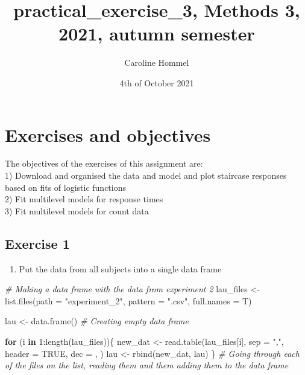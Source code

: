 \documentclass[
]{article}
\title{practical\_exercise\_3, Methods 3, 2021, autumn semester}
\author{Caroline Hommel}
\date{4th of October 2021}
\newenvironment{Shaded}{\begin{snugshade}}{\end{snugshade}}
\newcommand{\AttributeTok}[1]{\textcolor[rgb]{0.77,0.63,0.00}{#1}}
\newcommand{\CommentTok}[1]{\textcolor[rgb]{0.56,0.35,0.01}{\textit{#1}}}
\newcommand{\ConstantTok}[1]{\textcolor[rgb]{0.00,0.00,0.00}{#1}}
\newcommand{\ControlFlowTok}[1]{\textcolor[rgb]{0.13,0.29,0.53}{\textbf{#1}}}
\newcommand{\DecValTok}[1]{\textcolor[rgb]{0.00,0.00,0.81}{#1}}
\newcommand{\FunctionTok}[1]{\textcolor[rgb]{0.00,0.00,0.00}{#1}}
\newcommand{\NormalTok}[1]{#1}
\newcommand{\OtherTok}[1]{\textcolor[rgb]{0.56,0.35,0.01}{#1}}
\newcommand{\SpecialCharTok}[1]{\textcolor[rgb]{0.00,0.00,0.00}{#1}}
\newcommand{\StringTok}[1]{\textcolor[rgb]{0.31,0.60,0.02}{#1}}
\providecommand{\tightlist}{%
  \setlength{\itemsep}{0pt}\setlength{\parskip}{0pt}}
\begin{document}
\maketitle

\hypertarget{exercises-and-objectives}{%
\section{Exercises and objectives}\label{exercises-and-objectives}}

The objectives of the exercises of this assignment are:\\
1) Download and organised the data and model and plot staircase
responses based on fits of logistic functions\\
2) Fit multilevel models for response times\\
3) Fit multilevel models for count data

\hypertarget{exercise-1}{%
\subsection{Exercise 1}\label{exercise-1}}

\begin{enumerate}
\def\labelenumi{\arabic{enumi})}
\tightlist
\item
  Put the data from all subjects into a single data frame
\end{enumerate}

\begin{Shaded}
\begin{Highlighting}[]
\CommentTok{\# Making a data frame with the data from experiment 2}
\NormalTok{lau\_files }\OtherTok{\textless{}{-}} \FunctionTok{list.files}\NormalTok{(}\AttributeTok{path =} \StringTok{"experiment\_2"}\NormalTok{,}
                    \AttributeTok{pattern =} \StringTok{".csv"}\NormalTok{,}
                    \AttributeTok{full.names =}\NormalTok{ T)}

\NormalTok{lau }\OtherTok{\textless{}{-}} \FunctionTok{data.frame}\NormalTok{() }\CommentTok{\# Creating empty data frame}

\ControlFlowTok{for}\NormalTok{ (i }\ControlFlowTok{in} \DecValTok{1}\SpecialCharTok{:}\FunctionTok{length}\NormalTok{(lau\_files))\{}
\NormalTok{  new\_dat }\OtherTok{\textless{}{-}} \FunctionTok{read.table}\NormalTok{(lau\_files[i], }\AttributeTok{sep =} \StringTok{","}\NormalTok{, }\AttributeTok{header =} \ConstantTok{TRUE}\NormalTok{, }\AttributeTok{dec =} \StringTok{\textquotesingle{},\textquotesingle{}}\NormalTok{ )}
\NormalTok{  lau }\OtherTok{\textless{}{-}} \FunctionTok{rbind}\NormalTok{(new\_dat, lau)}
\NormalTok{\} }\CommentTok{\# Going through each of the files on the list, reading them and them adding them to the data frame}
\end{Highlighting}
\end{Shaded}
\end{document}
